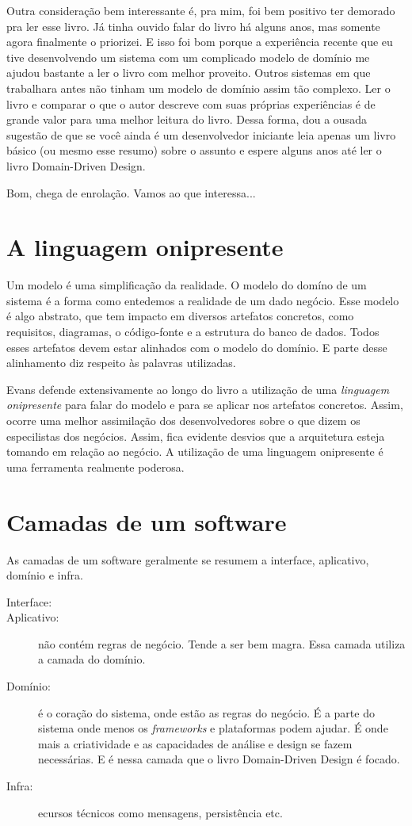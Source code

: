 \documentclass[a4paper, 12pt]{article}
\begin{document}
Outra consideração bem interessante é, pra mim, foi bem positivo ter demorado pra ler esse livro. Já tinha ouvido falar do livro há alguns anos, mas somente agora finalmente o priorizei. E isso foi bom porque a experiência recente que eu tive desenvolvendo um sistema com um complicado modelo de domínio me ajudou bastante a ler o livro com melhor proveito. Outros sistemas em que trabalhara antes não tinham um modelo de domínio assim tão complexo. Ler o livro e comparar o que o autor descreve com suas próprias experiências é de grande valor para uma melhor leitura do livro. Dessa forma, dou a ousada sugestão de que se você ainda é um desenvolvedor iniciante leia apenas um livro básico (ou mesmo esse resumo) sobre o assunto e espere alguns anos até ler o livro Domain-Driven Design.

Bom, chega de enrolação. Vamos ao que interessa...

\section{A linguagem onipresente}

Um modelo é uma simplificação da realidade. O modelo do domíno de um sistema é a forma como entedemos a realidade de um dado negócio. Esse modelo é algo abstrato, que tem impacto em diversos artefatos concretos, como requisitos, diagramas, o código-fonte e a estrutura do banco de dados. Todos esses artefatos devem estar alinhados com o modelo do domínio. E parte desse alinhamento diz respeito às palavras utilizadas. 

Evans defende extensivamente ao longo do livro a utilização de uma \emph{linguagem onipresente} para falar do modelo e para se aplicar nos artefatos concretos. Assim, ocorre uma melhor assimilação dos desenvolvedores sobre o que dizem os especilistas dos negócios. Assim, fica evidente desvios que a arquitetura esteja tomando em relação ao negócio. A utilização de uma linguagem onipresente é uma ferramenta realmente poderosa.

\section{Camadas de um software}

As camadas de um software geralmente se resumem a interface, aplicativo, domínio e infra.

\begin{description}
\item [Interface:]
\item [Aplicativo:] não contém regras de negócio. Tende a ser bem magra. Essa camada utiliza a camada do domínio.
\item [Domínio:] é o coração do sistema, onde estão as regras do negócio. É a parte do sistema onde menos os \emph{frameworks} e plataformas podem ajudar. É onde mais a criatividade e as capacidades de análise e design se fazem necessárias. E é nessa camada que o livro Domain-Driven Design é focado.
\item [Infra:] ecursos técnicos como mensagens, persistência etc.
\end{description}
\end{document}
